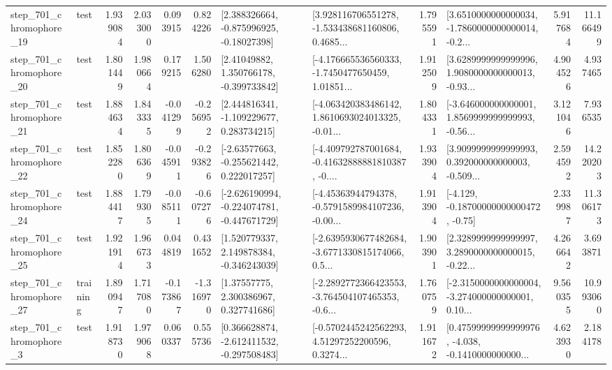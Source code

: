 \begin{tabular}{llrrrrllrlrr}
  step\_701\_chromophore\_19 &      test &      1.939084 &    2.033000 &      0.093915 &  0.824226 &    [2.388326664, -0.875996925, -0.18027398] &  [3.928116706551278, -1.533438681160806, 0.4685... &       1.795591 &  [3.6510000000000034, -1.7860000000000014, -0.2... &            5.917684 &         11.166499 \\
  step\_701\_chromophore\_20 &      test &      1.801449 &    1.980664 &      0.179215 &  1.506280 &     [2.41049882, 1.350766178, -0.399733842] &  [-4.176665536560333, -1.7450477650459, 1.01851... &       1.912509 &  [3.6289999999999996, 1.9080000000000013, -0.93... &            4.904526 &          4.937465 \\
  step\_701\_chromophore\_21 &      test &      1.884634 &    1.843335 &     -0.041299 & -0.256952 &    [2.444816341, -1.109229677, 0.283734215] &  [-4.063420383486142, 1.8610693024013325, -0.01... &       1.804331 &  [-3.646000000000001, 1.8569999999999993, -0.56... &            3.121046 &          7.936535 \\
  step\_701\_chromophore\_22 &      test &      1.852280 &    1.806369 &     -0.045911 & -0.293826 &    [-2.63577663, -0.255621442, 0.222017257] &  [-4.409792787001684, -0.41632888881810387, -0.... &       1.933904 &  [3.9099999999999993, 0.392000000000003, -0.509... &            2.594592 &         14.220203 \\
  step\_701\_chromophore\_24 &      test &      1.884417 &    1.799305 &     -0.085111 & -0.607276 &  [-2.626190994, -0.224074781, -0.447671729] &  [-4.45363944794378, -0.5791589984107236, -0.00... &       1.913904 &              [-4.129, -0.18700000000000472, -0.75] &            2.339987 &         11.306173 \\
  step\_701\_chromophore\_25 &      test &      1.921914 &    1.966733 &      0.044819 &  0.431652 &    [1.520779337, 2.149878384, -0.346243039] &  [-2.6395930677482684, -3.6771330815174066, 0.5... &       1.903901 &  [2.3289999999999997, 3.2890000000000015, -0.22... &            4.266642 &          3.693871 \\
  step\_701\_chromophore\_27 &  training &      1.890947 &    1.717080 &     -0.173867 & -1.316970 &      [1.37557775, 2.300386967, 0.327741686] &  [-2.2892772366423553, -3.764504107465353, -0.6... &       1.760759 &  [-2.3150000000000004, -3.274000000000001, 0.10... &            9.560355 &         10.993060 \\
   step\_701\_chromophore\_3 &      test &      1.918730 &    1.979068 &      0.060337 &  0.555736 &   [0.366628874, -2.612411532, -0.297508483] &  [-0.5702445242562293, 4.51297252200596, 0.3274... &       1.911672 &  [0.47599999999999976, -4.038, -0.1410000000000... &            4.623930 &          2.184178 \\

\end{tabular}
